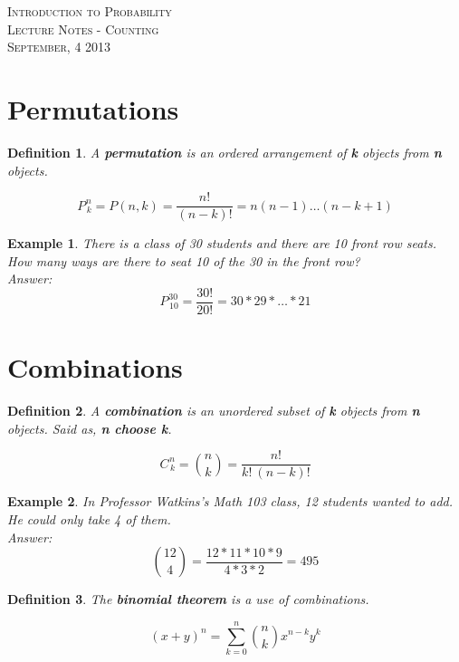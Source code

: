 \documentclass{article}
\newtheorem{defn}{Definition}
\newtheorem{ex}{Example}[defn]
\newcommand{\classname}{
Introduction to Probability
}
\newcommand{\perm}[3]{
#1_{\hspace{2pt}#3}^{\hspace{1pt}#2}
}
\begin{document}
\begin{center}
\textsc{\Large \classname}\\[.3cm]
\textsc{\Large Lecture Notes - Counting}\\[.3cm]
\textsc{\large September, 4 2013}
\end{center}

\section*{Permutations}
\begin{defn}
A \textbf{permutation} is an ordered arrangement of \textbf{k} objects from \textbf{n} objects.
\end{defn}
\begin{equation}
\perm{P}{n}{k} = P(n,k) = \frac{n!}{(n-k)!} = n (n-1)\ldots(n-k+1)
\end{equation}
\begin{ex}
There is a class of 30 students and there are 10 front row seats. How many ways are there to seat 10 of the 30 in the front row?\\
\indent \textit{Answer:} $$ \perm{P}{30}{10} = \frac{30!}{20!} = 30 * 29 * \ldots * 21 $$
\end{ex}

\section*{Combinations}
\begin{defn}
A \textbf{combination} is an unordered subset of \textbf{k} objects from \textbf{n} objects. Said as, \textbf{n choose k}.
\end{defn}

\begin{equation}
\perm{C}{n}{k} = {n \choose k} = \frac{n!}{k!\ (n-k)!}
\end{equation}

\begin{ex}
In Professor Watkins's Math 103 class, 12 students wanted to add. He could only take 4 of them.\\
\indent \textit{Answer:} $${12 \choose 4} = \frac{12*11*10*9}{4*3*2} = 495 $$
\end{ex}

\begin{defn}
The \textbf{binomial theorem} is a use of combinations.
\end{defn}

\begin{equation}
(x+y)^n=\sum_{k=0}^n\binom nk x^{n-k}y^k
\end{equation}
\end{document}
